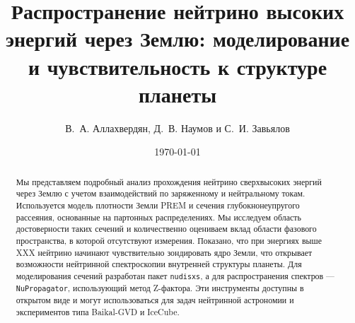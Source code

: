 \documentclass[12pt]{article}
\title{Распространение нейтрино высоких энергий через Землю: моделирование и чувствительность к структуре планеты}
\author{В.~А. Аллахвердян, Д.~В. Наумов и С.~И. Завьялов}
\date{\today}
\begin{document}
\maketitle

\begin{abstract}
    Мы представляем подробный анализ прохождения нейтрино сверхвысоких энергий через Землю с учетом взаимодействий по заряженному и нейтральному токам. Используется модель плотности Земли PREM и сечения глубокнонеупругого рассеяния, основанные на партонных распределениях. Мы исследуем область достоверности таких сечений и количественно оцениваем вклад области фазового пространства, в которой отсутствуют измерения. Показано, что при энергиях выше XXX нейтрино начинают чувствительно зондировать ядро Земли, что открывает возможности нейтринной спектроскопии внутренней структуры планеты. Для моделирования сечений разработан пакет \texttt{nudisxs}, а для распространения спектров — \texttt{NuPropagator}, использующий метод Z-фактора. Эти инструменты доступны в открытом виде и могут использоваться для задач нейтринной астрономии и экспериментов типа Baikal-GVD и IceCube.

\end{abstract}

\tableofcontents








\appendix




\end{document}
